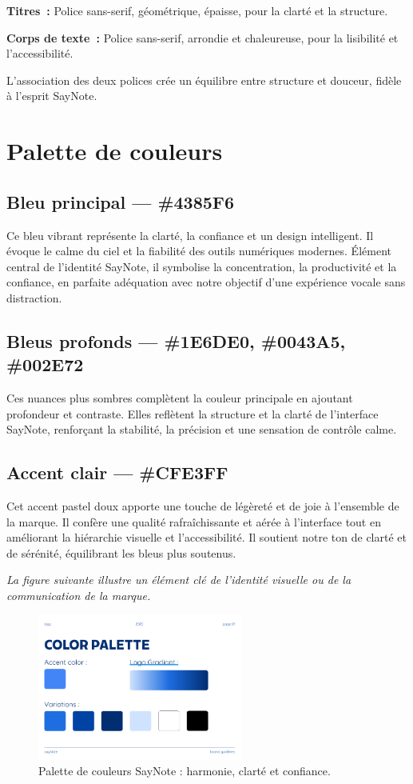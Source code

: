 \textbf{Titres~:}
Police sans-serif, géométrique, épaisse, pour la clarté et la structure.

\textbf{Corps de texte~:}
Police sans-serif, arrondie et chaleureuse, pour la lisibilité et l’accessibilité.

L’association des deux polices crée un équilibre entre structure et douceur, fidèle à l’esprit SayNote.

\section{Palette de couleurs}
\subsection{Bleu principal — \#4385F6}
Ce bleu vibrant représente la clarté, la confiance et un design intelligent. Il évoque le calme du ciel et la fiabilité des outils numériques modernes. Élément central de l’identité SayNote, il symbolise la concentration, la productivité et la confiance, en parfaite adéquation avec notre objectif d’une expérience vocale sans distraction.

\subsection{Bleus profonds — \#1E6DE0, \#0043A5, \#002E72}
Ces nuances plus sombres complètent la couleur principale en ajoutant profondeur et contraste. Elles reflètent la structure et la clarté de l’interface SayNote, renforçant la stabilité, la précision et une sensation de contrôle calme.

\subsection{Accent clair — \#CFE3FF}
Cet accent pastel doux apporte une touche de légèreté et de joie à l’ensemble de la marque. Il confère une qualité rafraîchissante et aérée à l’interface tout en améliorant la hiérarchie visuelle et l’accessibilité. Il soutient notre ton de clarté et de sérénité, équilibrant les bleus plus soutenus.

\noindent
\textit{La figure suivante illustre un élément clé de l'identité visuelle ou de la communication de la marque.}
\begin{figure}[H]
    \centering
    \includegraphics[width=0.6\textwidth]{docs/visual-indentity/pictures/color-palette.png}
    \caption{Palette de couleurs SayNote : harmonie, clarté et confiance.}
\end{figure}

